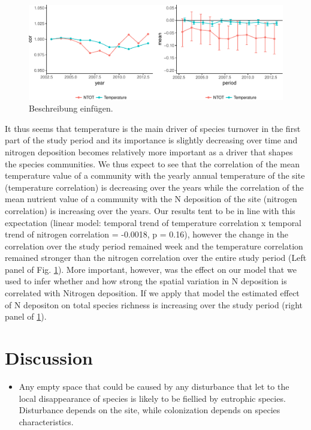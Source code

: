 \documentclass[fleqn,10pt,lineno]{wlpeerj} %
\providecommand{\tightlist}{
\setlength{\itemsep}{0pt}\setlength{\parskip}{0pt}}
\theoremstyle{definition}
\theoremstyle{definition}
\theoremstyle{definition}
\theoremstyle{remark}
\begin{document}
\begin{figure}
\includegraphics[width=1\linewidth]{Manuscript_files/figure-latex/figconsequences-1} \caption{Beschreibung einfügen.}\label{fig:figconsequences}
\end{figure}

It thus seems that temperature is the main driver of species turnover in
the first part of the study period and its importance is slightly
decreasing over time and nitrogen deposition becomes relatively more
important as a driver that shapes the species communities. We thus
expect to see that the correlation of the mean temperature value of a
community with the yearly annual temperature of the site (temperature
correlation) is decreasing over the years while the correlation of the
mean nutrient value of a community with the N deposition of the site
(nitrogen correlation) is increasing over the years. Our results tent to
be in line with this expectation (linear model: temporal trend of
temperature correlation x temporal trend of nitrogen correlation =
-0.0018, p = 0.16), however the change in the correlation over the study
period remained week and the temperature correlation remained stronger
than the nitrogen correlation over the entire study period (Left panel
of Fig. \ref{fig:figconsequences}). More important, however, was the
effect on our model that we used to infer whether and how strong the
spatial variation in N deposition is correlated with Nitrogen
deposition. If we apply that model the estimated effect of N depositon
on total species richness is increasing over the study period (right
panel of \ref{fig:figconsequences}).

\section*{Discussion}\label{discussion}

\begin{itemize}
\tightlist
\item
  Any empty space that could be caused by any disturbance that let to
  the local disappearance of species is likely to be fiellied by
  eutrophic species. Disturbance depends on the site, while colonization
  depends on species characteristics.
\end{itemize}
\end{document}
